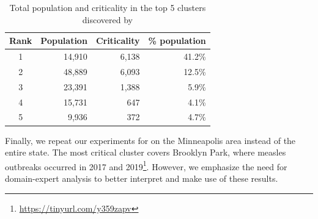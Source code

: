 \begin{table}
\centering
\caption{Total population and criticality in the top 5 clusters discovered by \algomaxcrit{}
}
\label{tab:top5-scores}
\begin{tabular}{|c|r|r|r|}
\hline
\textbf{Rank} & \textbf{Population} & \textbf{Criticality} & \textbf{\% population}\\
\hline
1 & 14,910 & 6,138 & 41.2\%\\
2 & 48,889 & 6,093 & 12.5\%\\
3 & 23,391 & 1,388 & 5.9\%\\
4 & 15,731 &   647 & 4.1\%\\
5 &  9,936 &   372 & 4.7\%\\
\hline
\end{tabular}
\end{table}

Finally, we repeat our experiments for \maxcrit{} on the Minneapolis area instead of the entire state. The most critical cluster covers Brooklyn Park, where measles outbreaks occurred in 2017 and 2019\footnote{\url{https://tinyurl.com/y359zapv}}. However, we emphasize the need for domain-expert analysis to better interpret and make use of these results.





